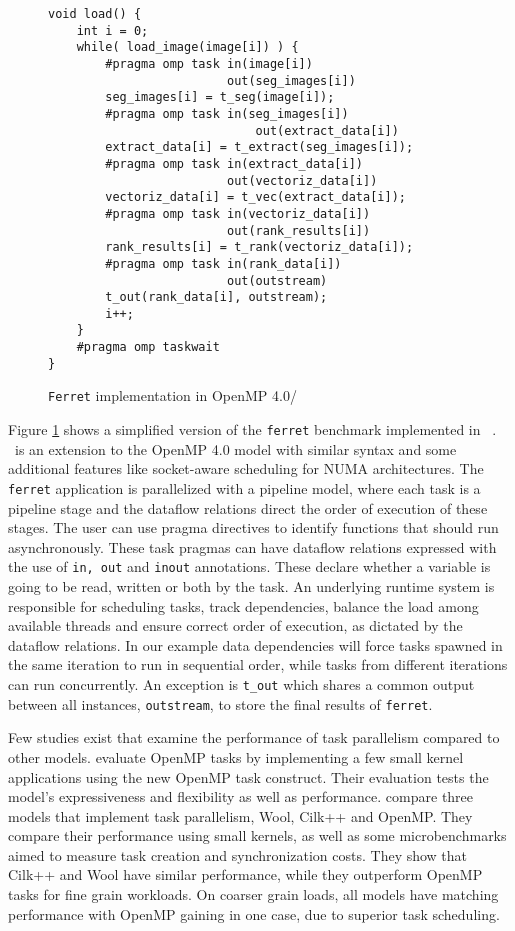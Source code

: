\begin{figure}[ht!]%
	\begin{lstlisting}
void load() {
	int i = 0;
	while( load_image(image[i]) ) {
		#pragma omp task in(image[i]) 
		                 out(seg_images[i])
		seg_images[i] = t_seg(image[i]);
		#pragma omp task in(seg_images[i])
				             out(extract_data[i])
		extract_data[i] = t_extract(seg_images[i]);
		#pragma omp task in(extract_data[i])
		                 out(vectoriz_data[i])
		vectoriz_data[i] = t_vec(extract_data[i]);
		#pragma omp task in(vectoriz_data[i]) 
		                 out(rank_results[i])
		rank_results[i] = t_rank(vectoriz_data[i]);
		#pragma omp task in(rank_data[i]) 
		                 out(outstream)
		t_out(rank_data[i], outstream);
		i++;
	}
	#pragma omp taskwait
}
	\end{lstlisting}
	\caption{\texttt{Ferret} implementation in OpenMP 4.0/\OMPSS{}}%
	\label{lst:ferret-ompss}%
\end{figure} 

Figure \ref{lst:ferret-ompss} shows a simplified version of the \texttt{ferret} benchmark
implemented in \OMPSS{}~\cite{Duran:PPL2011}.  \OMPSS{}~is an extension to the OpenMP 4.0
model with similar syntax and some additional features like socket-aware scheduling for
NUMA architectures.  The \texttt{ferret} application is parallelized with a pipeline
model, where each task is a pipeline stage and the dataflow relations direct the order of
execution of these stages.  The user can use pragma directives to identify functions that
should run asynchronously.  These task pragmas can have dataflow relations expressed with
the use of \texttt{in, out} and \texttt{inout} annotations. These declare whether a
variable is going to be read, written or both by the task.  An underlying runtime system
is responsible for scheduling tasks, track dependencies, balance the load  among available
threads and ensure correct order of execution, as dictated by the dataflow relations.  In
our example data dependencies will force tasks spawned in the same iteration to run in
sequential order, while tasks from different iterations can run concurrently.  An
exception is \texttt{t\_out} which shares a common output between all instances,
\texttt{outstream}, to store the final results of \texttt{ferret}.

Few studies exist that examine the performance of task parallelism compared to other
models.  \cite{10.1007/978-3-540-85261-2_5} evaluate OpenMP tasks by implementing a
few small kernel applications using the new OpenMP task construct.  Their evaluation tests
the model's expressiveness and flexibility as well as performance.  \cite{Podobas503167}
compare three models that implement task parallelism, Wool, Cilk++ and OpenMP.  They
compare their performance using small kernels, as well as some microbenchmarks aimed to
measure task creation and synchronization costs.  They show that Cilk++ and Wool have
similar performance, while they outperform OpenMP tasks for fine grain workloads.  On
coarser grain loads, all models have matching performance with OpenMP gaining in one case,
due to superior task scheduling.

